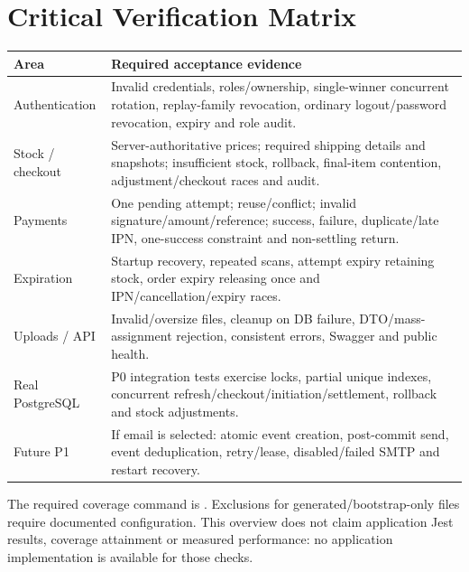 \section{Critical Verification Matrix}
\begin{longtable}{@{}p{35mm}p{118mm}@{}}
\toprule
Area & Required acceptance evidence \\
\midrule\endhead
Authentication & Invalid credentials, roles/ownership, single-winner concurrent rotation, replay-family revocation, ordinary logout/password revocation, expiry and role audit. \\
Stock / checkout & Server-authoritative prices; required shipping details and snapshots; insufficient stock, rollback, final-item contention, adjustment/checkout races and audit. \\
Payments & One pending attempt; reuse/conflict; invalid signature/amount/reference; success, failure, duplicate/late IPN, one-success constraint and non-settling return. \\
Expiration & Startup recovery, repeated scans, attempt expiry retaining stock, order expiry releasing once and IPN/cancellation/expiry races. \\
Uploads / API & Invalid/oversize files, cleanup on DB failure, DTO/mass-assignment rejection, consistent errors, Swagger and public health. \\
Real PostgreSQL & P0 integration tests exercise locks, partial unique indexes, concurrent refresh/checkout/initiation/settlement, rollback and stock adjustments. \\
Future P1 & If email is selected: atomic event creation, post-commit send, event deduplication, retry/lease, disabled/failed SMTP and restart recovery. \\
\bottomrule
\end{longtable}

The required coverage command is . Exclusions for generated/bootstrap-only files require documented configuration. This overview does not claim application Jest results, coverage attainment or measured performance: no application implementation is available for those checks.

